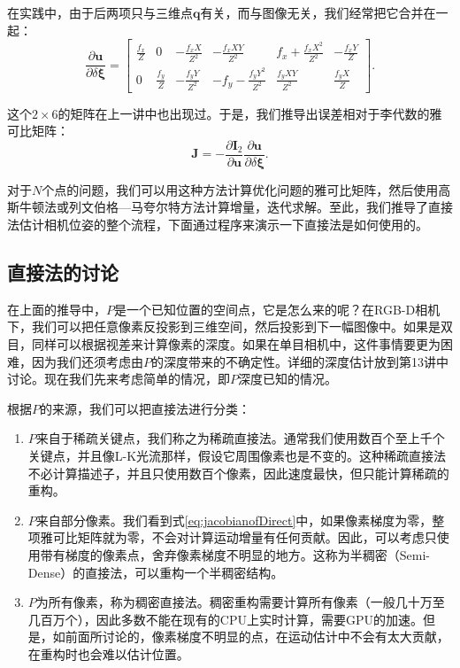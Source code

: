 在实践中，由于后两项只与三维点$\bm{q}$有关，而与图像无关，我们经常把它合并在一起：
\begin{equation}
\frac{{\partial \bm{u}}}{{\partial \delta \bm{\xi} }} = \left[ {\begin{array}{*{20}{c}}
	{\frac{{{f_x}}}{Z}}&0&{ - \frac{{{f_x}X}}{{{Z^2}}}}&{ - \frac{{{f_x}XY}}{{{Z^2}}}}&{{f_x} + \frac{{{f_x}{X^2}}}{{{Z^2}}}}&{ - \frac{{{f_x}Y}}{Z}}\\
	0&{\frac{{{f_y}}}{Z}}&{ - \frac{{{f_y}Y}}{{{Z^2}}}}&{ - {f_y} - \frac{{{f_y}{Y^2}}}{{{Z^2}}}}&{\frac{{{f_y}XY}}{{{Z^2}}}}&{\frac{{{f_y}X}}{Z}}
	\end{array}} \right].
\end{equation}

这个$2 \times 6$的矩阵在上一讲中也出现过。于是，我们推导出误差相对于李代数的雅可比矩阵：
\begin{equation}
\label{eq:jacobianofDirect}
\bm{J} =  - \frac{{\partial { \bm{I}_2}}}{{\partial \bm{u}}}\frac{{\partial \bm{u}}}{{\partial \delta \bm{\xi} }}.
\end{equation}

对于$N$个点的问题，我们可以用这种方法计算优化问题的雅可比矩阵，然后使用高斯牛顿法或列文伯格—马夸尔特方法计算增量，迭代求解。至此，我们推导了直接法估计相机位姿的整个流程，下面通过程序来演示一下直接法是如何使用的。

\subsection{直接法的讨论}
在上面的推导中，$P$是一个已知位置的空间点，它是怎么来的呢？在RGB-D相机下，我们可以把任意像素反投影到三维空间，然后投影到下一幅图像中。如果是双目，同样可以根据视差来计算像素的深度。如果在单目相机中，这件事情要更为困难，因为我们还须考虑由$P$的深度带来的不确定性。详细的深度估计放到第13讲中讨论。现在我们先来考虑简单的情况，即$P$深度已知的情况。

根据$P$的来源，我们可以把直接法进行分类：
\begin{enumerate}
	\item $P$来自于稀疏关键点，我们称之为稀疏直接法。通常我们使用数百个至上千个关键点，并且像L-K光流那样，假设它周围像素也是不变的。这种稀疏直接法不必计算描述子，并且只使用数百个像素，因此速度最快，但只能计算稀疏的重构。
	\item $P$来自部分像素。我们看到式\eqref{eq:jacobianofDirect}中，如果像素梯度为零，整项雅可比矩阵就为零，不会对计算运动增量有任何贡献。因此，可以考虑只使用带有梯度的像素点，舍弃像素梯度不明显的地方。这称为半稠密（Semi-Dense）的直接法，可以重构一个半稠密结构。
	\item $P$为所有像素，称为稠密直接法。稠密重构需要计算所有像素（一般几十万至几百万个），因此多数不能在现有的CPU上实时计算，需要GPU的加速。但是，如前面所讨论的，像素梯度不明显的点，在运动估计中不会有太大贡献，在重构时也会难以估计位置。
\end{enumerate}


